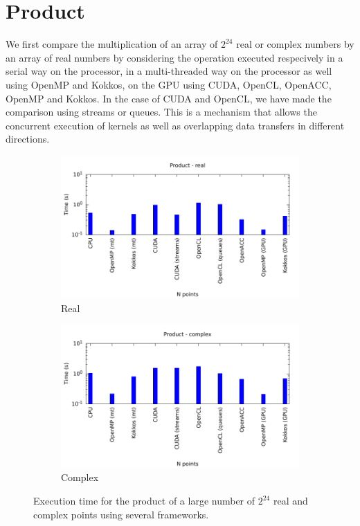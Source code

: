 \documentclass[12pt, a4paper]{article}
\begin{document}
\section{Product}\label{PRODUCT}
We first compare the multiplication of an array of $2^{24}$ real or complex numbers by an array of real numbers by considering the operation executed respecively in a serial way on the processor, in a multi-threaded way on the processor as well using OpenMP and Kokkos, on the GPU using CUDA, OpenCL, OpenACC, OpenMP and Kokkos. In the case of CUDA and OpenCL, we have made the comparison using streams or queues. This is a mechanism that allows the concurrent execution of kernels as well as overlapping data transfers in different directions.
\begin{figure}[H]
\captionsetup{width=0.8\linewidth}
\centering
\begin{subfigure}{.5\textwidth}
\centering
\includegraphics[width=.9\linewidth]{graphs/product-r.pdf}
\caption{Real}
\label{PRODR}
\end{subfigure}%
\begin{subfigure}{.5\textwidth}
\centering
\includegraphics[width=.9\linewidth]{graphs/product-c.pdf}
\caption{Complex}
\label{PRODC}
\end{subfigure}
\caption{Execution time for the product of a large number of $2^{24}$ real and complex points using several frameworks.}
\label{1DFFTW}
\end{figure}
\end{document}
